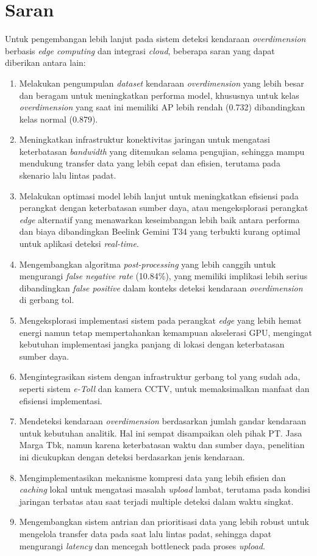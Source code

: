 \section{Saran}
\label{sec:saran}
Untuk pengembangan lebih lanjut pada sistem deteksi kendaraan \emph{overdimension} berbasis \emph{edge computing} dan integrasi \emph{cloud}, beberapa saran yang dapat diberikan antara lain:
\begin{enumerate}[nolistsep]
  \item Melakukan pengumpulan \emph{dataset} kendaraan \emph{overdimension} yang lebih besar dan beragam untuk meningkatkan performa model, khususnya untuk kelas \emph{overdimension} yang saat ini memiliki AP lebih rendah (0.732) dibandingkan kelas normal (0.879).
  \item Meningkatkan infrastruktur konektivitas jaringan untuk mengatasi keterbatasan \emph{bandwidth} yang ditemukan selama pengujian, sehingga mampu mendukung transfer data yang lebih cepat dan efisien, terutama pada skenario lalu lintas padat.
  \item Melakukan optimasi model lebih lanjut untuk meningkatkan efisiensi pada perangkat dengan keterbatasan sumber daya, atau mengeksplorasi perangkat \emph{edge} alternatif yang menawarkan keseimbangan lebih baik antara performa dan biaya dibandingkan Beelink Gemini T34 yang terbukti kurang optimal untuk aplikasi deteksi \emph{real-time}.
  \item Mengembangkan algoritma \emph{post-processing} yang lebih canggih untuk mengurangi \emph{false negative rate} (10.84\%), yang memiliki implikasi lebih serius dibandingkan \emph{false positive} dalam konteks deteksi kendaraan \emph{overdimension} di gerbang tol.
  \item Mengeksplorasi implementasi sistem pada perangkat \emph{edge} yang lebih hemat energi namun tetap mempertahankan kemampuan akselerasi GPU, mengingat kebutuhan implementasi jangka panjang di lokasi dengan keterbatasan sumber daya.
  \item Mengintegrasikan sistem dengan infrastruktur gerbang tol yang sudah ada, seperti sistem \emph{e-Toll} dan kamera CCTV, untuk memaksimalkan manfaat dan efisiensi implementasi.
  \item Mendeteksi kendaraan \emph{overdimension} berdasarkan jumlah gandar kendaraan untuk kebutuhan analitik. Hal ini sempat disampaikan oleh pihak PT. Jasa Marga Tbk, namun karena keterbatasan waktu dan sumber daya, penelitian ini dicukupkan dengan deteksi berdasarkan jenis kendaraan.
  \item Mengimplementasikan mekanisme kompresi data yang lebih efisien dan \emph{caching} lokal untuk mengatasi masalah \emph{upload} lambat, terutama pada kondisi jaringan terbatas atau saat terjadi multiple deteksi dalam waktu singkat.
  \item Mengembangkan sistem antrian dan prioritisasi data yang lebih robust untuk mengelola transfer data pada saat lalu lintas padat, sehingga dapat mengurangi \emph{latency} dan mencegah bottleneck pada proses \emph{upload}.
\end{enumerate}
